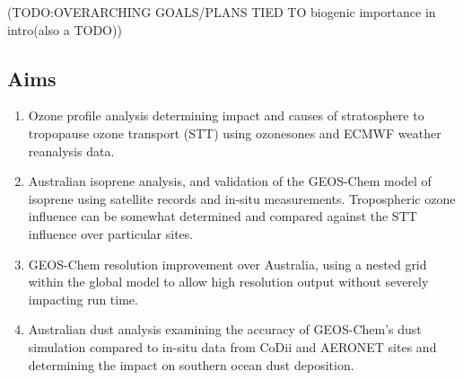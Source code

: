 (TODO:OVERARCHING GOALS/PLANS
TIED TO biogenic importance in intro(also a TODO))

\subsection{Aims}
\begin{enumerate}
\item Ozone profile analysis determining impact and causes of stratosphere to tropopause ozone transport (STT) using ozonesones and ECMWF weather reanalysis data.
\item Australian isoprene analysis, and validation of the GEOS-Chem model of isoprene using satellite records and in-situ measurements. 
Tropospheric ozone influence can be somewhat determined and compared against the STT influence over particular sites. 
\item GEOS-Chem resolution improvement over Australia, using a nested grid within the global model to allow high resolution output without severely impacting run time.
\item Australian dust analysis examining the accuracy of GEOS-Chem's dust simulation compared to in-situ data from CoDii and AERONET sites and determining the impact on southern ocean dust deposition.
\end{enumerate}